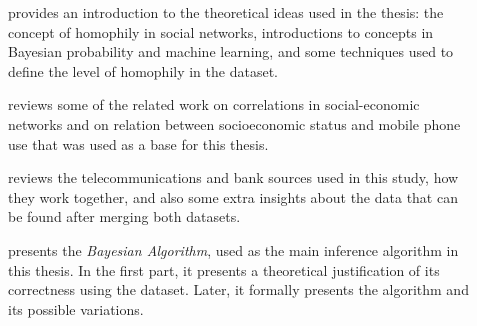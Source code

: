 \begin{description}
\item[] provides an introduction to the theoretical ideas used in the thesis: the concept of homophily in social networks, introductions to concepts in Bayesian probability and machine learning, and some techniques used to define the level of homophily in the dataset.
\item[] reviews some of the related work on correlations in social-economic networks and on relation between socioeconomic status and mobile phone use that was used as a base for this thesis.
\item[] reviews the telecommunications and bank sources used in this study, how they work together, and also some extra insights about the data that can be found after merging both datasets.
\item[] presents the \emph{Bayesian Algorithm}, used as the main inference algorithm in this thesis. In the first part, it presents a theoretical justification of its correctness using the dataset. Later, it formally presents the algorithm and its possible variations.
\item[]
\end{description}
